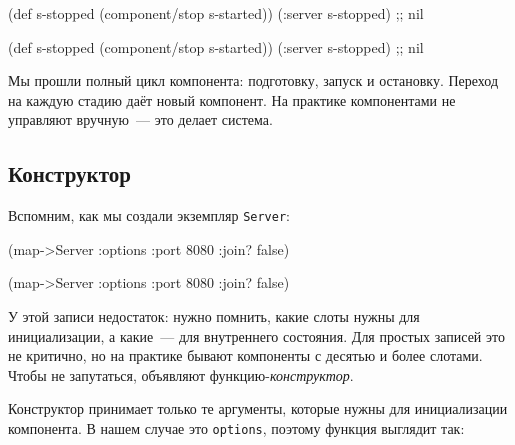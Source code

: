 \begin{english}
  \begin{clojure}
(def s-stopped
  (component/stop s-started))
(:server s-stopped) ;; nil
  \end{clojure}
\end{english}

\else

\begin{english}
  \begin{clojure}
(def s-stopped (component/stop s-started))
(:server s-stopped) ;; nil
  \end{clojure}
\end{english}

\fi

Мы прошли полный цикл компонента: подготовку, запуск и остановку. Переход на
каждую стадию даёт новый компонент. На практике компонентами не управляют
вручную~--- это делает система.

\subsection{Конструктор}


Вспомним, как мы создали экземпляр \verb|Server|:

\ifx\DEVICETYPE\MOBILE

\begin{english}
  \begin{clojure}
(map->Server
  {:options {:port 8080
             :join? false}})
  \end{clojure}
\end{english}

\else

\begin{english}
  \begin{clojure}
(map->Server {:options {:port 8080 :join? false}})
  \end{clojure}
\end{english}

\fi


У этой записи недостаток: нужно помнить, какие слоты нужны для инициализации, а
какие~--- для внутреннего состояния. Для простых записей это не критично, но на
практике бывают компоненты с десятью и более слотами. Чтобы не запутаться,
объявляют функцию-\emph{конструктор}.

Конструктор принимает только те аргументы, которые нужны для инициализации
компонента. В нашем случае это \verb|options|, поэтому функция выглядит так:

